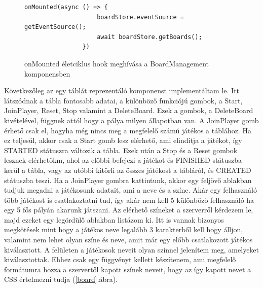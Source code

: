 \documentclass[a4paper,twoside]{article}
\begin{document}
\begin{figure}
	\caption{onMounted életciklus hook meghívása a BoardManagement komponensben}
	
		\begin{minipage}{\textwidth}
			\begin{lstlisting}[style=javascriptStyle]
				onMounted(async () => {
					boardStore.eventSource = getEventSource();
					await boardStore.getBoards();
				})
			\end{lstlisting}
		\end{minipage}
	
	\label{onMounted}
\end{figure}
\FloatBarrier

Következőleg az egy táblát reprezentáló komponenst implementáltam le. Itt látszódnak a tábla
fontosabb adatai, a különböző funkciójú gombok, a Start, JoinPlayer, Reset, Stop valamint a DeleteBoard. Ezek a gombok, a DeleteBoard kivételével, függnek attól hogy a pálya milyen állapotban van. A JoinPlayer gomb érhető csak el, hogyha még nincs meg a megfelelő számú játékos a táblához. Ha ez teljesül, akkor csak a Start gomb lesz elérhető, ami elindítja a játékot, így STARTED státuszra változik a tábla. Ezek után a Stop és a Reset gombok lesznek elérhetőkm, ahol az előbbi befejezi a játékot és FINISHED státuszba kerül a tábla, vagy az utóbbi kitörli az összes játékost a tábláról, és CREATED státuszba teszi. Ha a JoinPlayer gombra kattintunk, akkor egy feljövő ablakban tudjuk megadni a játékosunk adatait, ami a neve és a színe. Akár egy felhasználó több játékost is csatlakoztatni tud, így akár nem kell 5 különböző felhasználó ha egy 5 fős pályán akarunk játszani. Az elérhető színeket a szerverről kérdezem le, majd ezeket egy legördülő ablakban listázom ki. Itt is vannak bizonyos megkötések mint hogy a játékos neve legalább 3 karakterből kell hogy álljon, valamint nem lehet olyan színe és neve, amit már egy előbb csatlakozott játékos kiválasztott. A felületen a játékosok neveit olyan színnel jelenítem meg, amelyeket kiválasztottak. Ehhez csak egy függvényt kellett készítenem, ami megfelelő formátumra hozza a szervertől kapott színek neveit, hogy az így kapott nevet a CSS értelmezni tudja (\ref{board}.ábra). 
\end{document}
